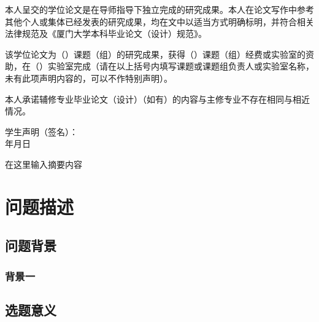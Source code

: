 \documentclass[14pt,a4paper]{xmuthesis}
\begin{document}
\begin{center}
\end{center}
\vspace{1cm}

本人呈交的学位论文是在导师指导下独立完成的研究成果。本人在论文写作中参考其他个人或集体已经发表的研究成果，均在文中以适当方式明确标明，并符合相关法律规范及《厦门大学本科毕业论文（设计）规范》。

该学位论文为（\hspace{13em}）课题（组）的研究成果，获得（\hspace{7em}）课题（组）经费或实验室的资助，在（\hspace{6em}）实验室完成（请在以上括号内填写课题或课题组负责人或实验室名称，未有此项声明内容的，可以不作特别声明）。

本人承诺辅修专业毕业论文（设计）（如有）的内容与主修专业不存在相同与相近情况。
\vspace{2cm}
\begin{flushleft}
    \hspace{16em}学生声明（签名）：\\
    \hspace{21em}年\hspace{2em}月\hspace{2em}日
\end{flushleft}
\thispagestyle{empty}
\addtocounter{pseudopage}{-1}


\normalsize
\begin{chineseabstract}

在这里输入摘要内容

\end{chineseabstract}

\thesistableofcontents



\chapter{问题描述}

\section{问题背景}
\subsection{背景一}

\section{选题意义}







\begin{thesisbibliography}

\end{thesisbibliography}

\thesisappendix
\end{document}

